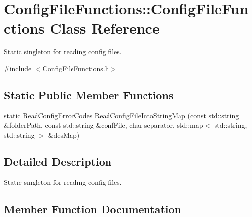 \hypertarget{class_config_file_functions_1_1_config_file_functions}{}\section{Config\+File\+Functions\+::Config\+File\+Functions Class Reference}
\label{class_config_file_functions_1_1_config_file_functions}


Static singleton for reading config files.  




{\ttfamily \#include $<$Config\+File\+Functions.\+h$>$}

\subsection*{Static Public Member Functions}
\begin{DoxyCompactItemize}
\item 
static \mbox{\hyperlink{namespace_config_file_functions_aa7fab72913bf30fd480cb3d7dbf47518}{Read\+Config\+Error\+Codes}} \mbox{\hyperlink{class_config_file_functions_1_1_config_file_functions_afcc2f55b2a8916d91e7960ead60a7e6e}{Read\+Config\+File\+Into\+String\+Map}} (const std\+::string \&folder\+Path, const std\+::string \&conf\+File, char separator, std\+::map$<$ std\+::string, std\+::string $>$ \&des\+Map)
\end{DoxyCompactItemize}


\subsection{Detailed Description}
Static singleton for reading config files. 

\subsection{Member Function Documentation}
\mbox{\label{class_config_file_functions_1_1_config_file_functions_afcc2f55b2a8916d91e7960ead60a7e6e}} 
